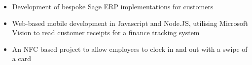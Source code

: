 \documentclass[10pt,a4paper,ragged2e]{altacv}
\begin{document}
\divider

\begin{itemize}
\item Development of bespoke Sage ERP implementations for customers
\item Web-based mobile development in Javascript and Node.JS, utilising Microsoft Vision to read customer receipts for a finance tracking system
\item An NFC based project to allow employees to clock in and out with a swipe of a card
\end{itemize}

\clearpage
\end{document}
